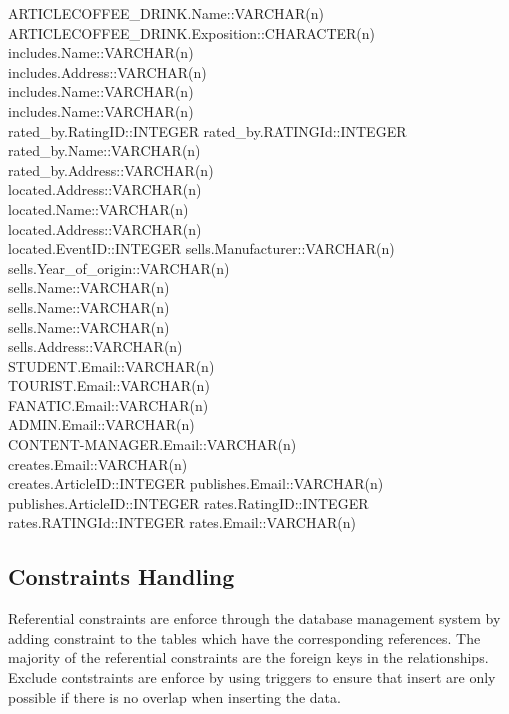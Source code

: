 ARTICLECOFFEE\_DRINK.Name::VARCHAR(n)\\
ARTICLECOFFEE\_DRINK.Exposition::CHARACTER(n)\\
includes.Name::VARCHAR(n)\\
includes.Address::VARCHAR(n)\\
includes.Name::VARCHAR(n)\\
includes.Name::VARCHAR(n)\\
rated\_by.RatingID::INTEGER
rated\_by.RATINGId::INTEGER
rated\_by.Name::VARCHAR(n)\\
rated\_by.Address::VARCHAR(n)\\
located.Address::VARCHAR(n)\\
located.Name::VARCHAR(n)\\
located.Address::VARCHAR(n)\\
located.EventID::INTEGER
sells.Manufacturer::VARCHAR(n)\\
sells.Year\_of\_origin::VARCHAR(n)\\
sells.Name::VARCHAR(n)\\
sells.Name::VARCHAR(n)\\
sells.Name::VARCHAR(n)\\
sells.Address::VARCHAR(n)\\
STUDENT.Email::VARCHAR(n)\\
TOURIST.Email::VARCHAR(n)\\
FANATIC.Email::VARCHAR(n)\\
ADMIN.Email::VARCHAR(n)\\
CONTENT-MANAGER.Email::VARCHAR(n)\\
creates.Email::VARCHAR(n)\\
creates.ArticleID::INTEGER
publishes.Email::VARCHAR(n)\\
publishes.ArticleID::INTEGER
rates.RatingID::INTEGER
rates.RATINGId::INTEGER
rates.Email::VARCHAR(n)\\
\subsection{Constraints Handling}
Referential constraints are enforce through the database management system by adding constraint to the tables which have the corresponding references. The majority of the referential constraints are the foreign keys in the relationships.\\
Exclude contstraints are enforce  by using triggers to ensure that insert are only possible if there is no overlap when inserting the data.\\

\newpage